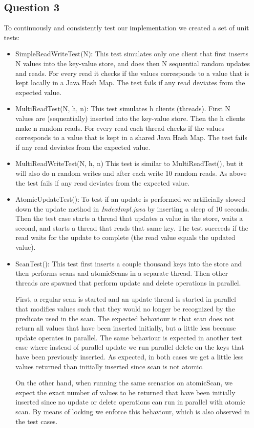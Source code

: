 \documentclass[12pt,a4paper]{article}
\begin{document}
\subsection*{Question 3}
\label{sec:pq3}
To continuously and consistently test our implementation we created a set of unit tests:
\begin{itemize}
\item SimpleReadWriteTest(N): This test simulates only one client that first inserts N values into the key-value store, and does then N sequential random updates and reads. For every read it checks if the values corresponds to a value that is kept locally in a Java Hash Map. The test fails if any read deviates from the expected value.
\item MultiReadTest(N, h, n): This test simulates h clients (threads). First N values are (sequentially) inserted into the key-value store. Then the h clients make n random reads. For every read each thread checks if the values corresponds to a value that is kept in a shared Java Hash Map. The test fails if any read deviates from the expected value.
\item MultiReadWriteTest(N, h, n) This test is similar to MultiReadTest(), but it will also do n random writes and after each write 10 random reads. As above the test fails if any read deviates from the expected value.
\item AtomicUpdateTest(): To test if an update is performed we artificially slowed down the update method in \emph{IndexImpl.java} by inserting a sleep of 10 seconds. Then the test case starts a thread that updates a value in the store, waits a second, and starts a thread that reads that same key. The test succeeds if the read waits for the update to complete (the read value equals the updated value).
\item ScanTest(): This test first inserts a couple thousand keys into the store and then performs scans and atomicScans in a separate thread. Then other threads are spawned that perform update and delete operations in parallel.

First, a regular scan is started and an update thread is started in parallel that modifies values such that they would no longer be recognized by the predicate used in the scan. The expected behaviour is that scan does not return all values that have been inserted initially, but a little less because update operates in parallel. The same behaviour is expected in another test case where instead of parallel update we run parallel delete on the keys that have been previously inserted. As expected, in both cases we get a little less values returned than initially inserted since scan is not atomic.

On the other hand, when running the same scenarios on atomicScan, we expect the exact number of values to be returned that have been initially inserted since no update or delete operations can run in parallel with atomic scan. By means of locking we enforce this behaviour, which is also observed in the test cases.
\end{itemize}
\end{document}
